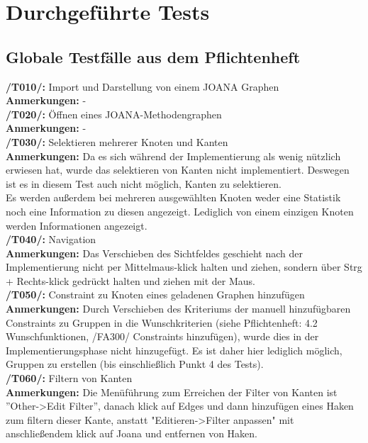 \chapter{Durchgeführte Tests}
\label{ch:durchgefuehrtetests}

\section{Globale Testfälle aus dem Pflichtenheft}

\textbf{/T010/: }Import und Darstellung von einem JOANA Graphen\\
\textbf{Anmerkungen: }-\\

\textbf{/T020/: }Öffnen eines JOANA-Methodengraphen\\
\textbf{Anmerkungen: }-\\

\textbf{/T030/: }Selektieren mehrerer Knoten und Kanten\\
\textbf{Anmerkungen: }Da es sich während der Implementierung als wenig nützlich erwiesen hat, wurde das selektieren von Kanten nicht implementiert. Deswegen ist es in diesem Test auch nicht möglich, Kanten zu selektieren.\\
	Es werden außerdem bei mehreren ausgewählten Knoten weder eine Statistik noch eine Information zu diesen angezeigt. Lediglich von einem einzigen Knoten werden Informationen angezeigt.\\

\textbf{/T040/: }Navigation\\
\textbf{Anmerkungen: }Das Verschieben des Sichtfeldes geschieht nach der Implementierung nicht per Mittelmaus-klick halten und ziehen, sondern über Strg + Rechts-klick gedrückt halten und ziehen mit der Maus.\\

\textbf{/T050/: }Constraint zu Knoten eines geladenen Graphen hinzufügen\\
\textbf{Anmerkungen: }Durch Verschieben des Kriteriums der manuell hinzufügbaren Constraints zu Gruppen in die Wunschkriterien (siehe Pflichtenheft: 4.2 Wunschfunktionen, /FA300/ Constraints hinzufügen), wurde dies in der Implementierungsphase nicht hinzugefügt. Es ist daher hier lediglich möglich, Gruppen zu erstellen (bis einschließlich Punkt 4 des Tests).\\

\textbf{/T060/: }Filtern von Kanten\\
\textbf{Anmerkungen: }Die Menüführung zum Erreichen der Filter von Kanten ist ''Other->Edit Filter'', danach klick auf Edges und dann hinzufügen eines Haken zum filtern dieser Kante, anstatt "Editieren->Filter anpassen" mit anschließendem klick auf Joana und entfernen von Haken.\\

